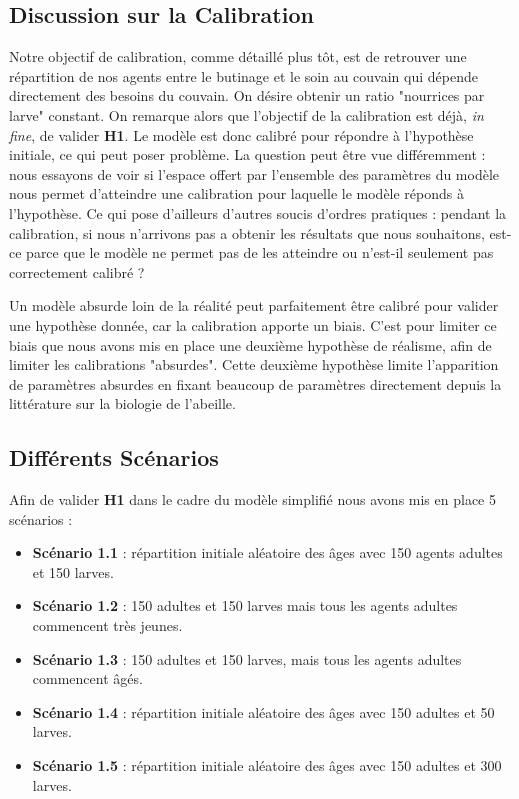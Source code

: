 		\subsection{Discussion sur la Calibration}
		
		Notre objectif de calibration, comme détaillé plus tôt, est de retrouver une répartition de nos agents entre le butinage et le soin au couvain qui dépende directement des besoins du couvain. On désire obtenir un ratio "nourrices par larve" constant. On remarque alors que l'objectif de la calibration est déjà, \textit{in fine}, de valider \textbf{H1}. Le modèle est donc calibré pour répondre à l'hypothèse initiale, ce qui peut poser problème. La question peut être vue différemment : nous essayons de voir si l'espace offert par l'ensemble des paramètres du modèle nous permet d'atteindre une calibration pour laquelle le modèle réponds à l'hypothèse. Ce qui pose d'ailleurs d'autres soucis d'ordres pratiques : pendant la calibration, si nous n'arrivons pas a obtenir les résultats que nous souhaitons, est-ce parce que le modèle ne permet pas de les atteindre ou n'est-il seulement pas correctement calibré ?
		
		Un modèle absurde loin de la réalité peut parfaitement être calibré pour valider une hypothèse donnée, car la calibration apporte un biais. C'est pour limiter ce biais que nous avons mis en place une deuxième hypothèse de réalisme, afin de limiter les calibrations "absurdes". Cette deuxième hypothèse limite l'apparition de paramètres absurdes en fixant beaucoup de paramètres directement depuis la littérature sur la biologie de l'abeille.
			
	\subsection{Différents Scénarios}
			
			Afin de valider \textbf{H1} dans le cadre du modèle simplifié nous avons mis en place 5 scénarios :
			\begin{itemize}
				\item \textbf{Scénario 1.1} : répartition initiale aléatoire des âges avec 150 agents adultes et 150 larves.
				\item \textbf{Scénario 1.2} : 150 adultes et 150 larves mais tous les agents adultes commencent très jeunes.
				\item \textbf{Scénario 1.3} : 150 adultes et 150 larves, mais tous les agents adultes commencent âgés.
				\item \textbf{Scénario 1.4} : répartition initiale aléatoire des âges avec 150 adultes et 50 larves.
				\item \textbf{Scénario 1.5} : répartition initiale aléatoire des âges avec 150 adultes et 300 larves.
			\end{itemize}
			
